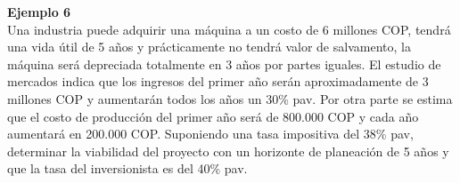 \textbf{Ejemplo 6}\\
Una industria puede adquirir una máquina a un costo de 6 millones COP, tendrá una vida útil de 5 años y prácticamente no tendrá valor de salvamento, la máquina será depreciada totalmente en 3 años por partes iguales. El estudio de mercados indica que los ingresos del primer año serán aproximadamente de 3 millones COP y aumentarán todos los años un 30\% pav. Por otra parte se estima que el costo de producción del primer año será de 800.000 COP y cada año aumentará en 200.000 COP. Suponiendo una tasa impositiva del 38\% pav, determinar la viabilidad del proyecto con un horizonte de planeación de 5 años y que la tasa del inversionista es del 40\% pav.\\




